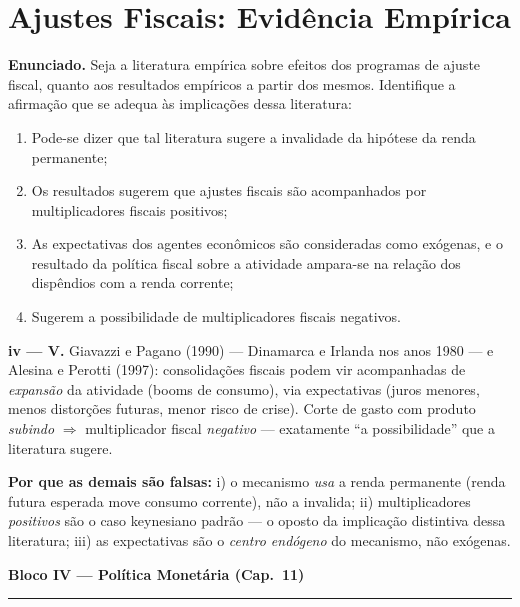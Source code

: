 \documentclass[12pt, a4paper]{article}
\begin{document}
\section{Ajustes Fiscais: Evidência Empírica}

\textbf{Enunciado.} Seja a literatura empírica sobre efeitos dos programas de
ajuste fiscal, quanto aos resultados empíricos a partir dos mesmos.
Identifique a afirmação que se adequa às implicações dessa literatura:

\begin{enumerate}[label=\roman*)]
\item Pode-se dizer que tal literatura sugere a invalidade da hipótese da
renda permanente;
\item Os resultados sugerem que ajustes fiscais são acompanhados por
multiplicadores fiscais positivos;
\item As expectativas dos agentes econômicos são consideradas como exógenas, e
o resultado da política fiscal sobre a atividade ampara-se na relação dos
dispêndios com a renda corrente;
\item Sugerem a possibilidade de multiplicadores fiscais negativos.
\end{enumerate}

\begin{correctbox}[title={Resposta: iv) --- contrações fiscais expansionistas (slides da Aula 13)}]
\textbf{iv --- V.} Giavazzi e Pagano (1990) --- Dinamarca e Irlanda nos anos
1980 --- e Alesina e Perotti (1997): consolidações fiscais podem vir
acompanhadas de \emph{expansão} da atividade (booms de consumo), via
expectativas (juros menores, menos distorções futuras, menor risco de crise).
Corte de gasto com produto \emph{subindo} $\Rightarrow$ multiplicador fiscal
\emph{negativo} --- exatamente ``a possibilidade'' que a literatura sugere.

\textbf{Por que as demais são falsas:} i) o mecanismo \emph{usa} a renda
permanente (renda futura esperada move consumo corrente), não a invalida;
ii) multiplicadores \emph{positivos} são o caso keynesiano padrão --- o
oposto da implicação distintiva dessa literatura; iii) as expectativas são o
\emph{centro endógeno} do mecanismo, não exógenas.
\end{correctbox}

\begin{center}
{\large\bfseries\color{cyanrbc} Bloco IV --- Política Monetária (Cap.\ 11)}\\[0.2em]
\rule{\linewidth}{0.6pt}
\end{center}
\end{document}
